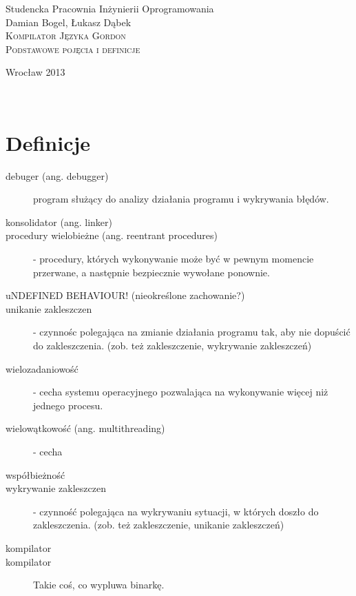 \documentclass[12pt]{article}
\begin{document}
\begin{titlepage}
\begin{center}
Studencka Pracownia Inżynierii Oprogramowania\\[3.5cm]

Damian Bogel, Łukasz Dąbek\\[1cm]
\textsc{\LARGE Kompilator Języka Gordon}\\[1cm]
\textsc{\large Podstawowe pojęcia i definicje}

\vfill
Wrocław 2013

\end{center}
\end{titlepage}

\newpage
\setcounter{page}{2}
~
\newpage

\section{Definicje}
\begin{description}
	\item[debuger (ang. debugger)] program służący do analizy działania programu
	i wykrywania błędów.
	\item[konsolidator (ang. linker)] 
	\item[procedury wielobieżne (ang. reentrant procedures)] - procedury,
	których wykonywanie może być w pewnym momencie przerwane, a następnie
	bezpiecznie wywołane ponownie.
	\item[uNDEFINED BEHAVIOUR! (nieokreślone zachowanie?)]
	\item[unikanie zakleszczen] - czynnośc polegająca na zmianie działania
	programu tak, aby nie dopuścić do zakleszczenia. (zob. też zakleszczenie,
	wykrywanie zakleszczeń)
	\item[wielozadaniowość] - cecha systemu operacyjnego pozwalająca na
	wykonywanie więcej niż jednego procesu.
	\item[wielowątkowość (ang. multithreading)] - cecha
	\item[współbieżność]
	\item[wykrywanie zakleszczen] - czynność polegająca na wykrywaniu sytuacji,
	w których doszło do zakleszczenia. (zob. też zakleszczenie, unikanie
	zakleszczeń)
	\item[kompilator]
    \item[kompilator] Takie coś, co wypluwa binarkę.
\end{description}
\end{document}
